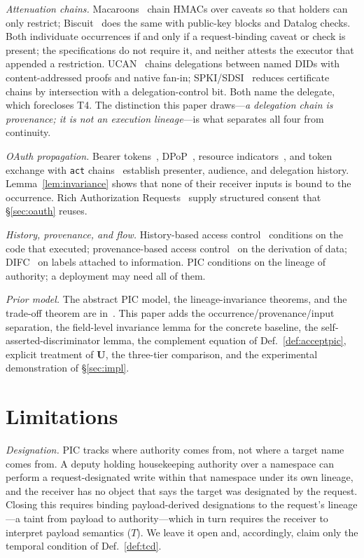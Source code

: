 \documentclass[conference]{IEEEtran}
\begin{document}
\emph{Attenuation chains.} Macaroons~\cite{macaroons} chain HMACs over caveats so that holders can only restrict; Biscuit~\cite{biscuit} does the same with public-key blocks and Datalog checks. Both individuate occurrences if and only if a request-binding caveat or check is present; the specifications do not require it, and neither attests the executor that appended a restriction. UCAN~\cite{ucan} chains delegations between named DIDs with content-addressed proofs and native fan-in; SPKI/SDSI~\cite{rfc2693} reduces certificate chains by intersection with a delegation-control bit. Both name the delegate, which forecloses T4. The distinction this paper draws---\emph{a delegation chain is provenance; it is not an execution lineage}---is what separates all four from continuity.

\emph{OAuth propagation.} Bearer tokens~\cite{rfc6749,rfc6750}, DPoP~\cite{rfc9449}, resource indicators~\cite{rfc8707}, and token exchange with \texttt{act} chains~\cite{rfc8693} establish presenter, audience, and delegation history. Lemma~\ref{lem:invariance} shows that none of their receiver inputs is bound to the occurrence. Rich Authorization Requests~\cite{rfc9396} supply structured consent that \S\ref{sec:oauth} reuses.

\emph{History, provenance, and flow.} History-based access control~\cite{abadi2003} conditions on the code that executed; provenance-based access control~\cite{park2012} on the derivation of data; DIFC~\cite{myers1997} on labels attached to information. PIC conditions on the lineage of authority; a deployment may need all of them.

\emph{Prior model.} The abstract PIC model, the lineage-invariance theorems, and the trade-off theorem are in~\cite{gallo2026poc}. This paper adds the occurrence/provenance/input separation, the field-level invariance lemma for the concrete baseline, the self-asserted-discriminator lemma, the complement equation of Def.~\ref{def:acceptpic}, explicit treatment of $\mathbf{U}$, the three-tier comparison, and the experimental demonstration of \S\ref{sec:impl}.

\section{Limitations}\label{sec:limits}

\emph{Designation.} PIC tracks where authority comes from, not where a target name comes from. A deputy holding housekeeping authority over a namespace can perform a request-designated write within that namespace under its own lineage, and the receiver has no object that says the target was designated by the request. Closing this requires binding payload-derived designations to the request's lineage---a taint from payload to authority---which in turn requires the receiver to interpret payload semantics ($T$). We leave it open and, accordingly, claim only the temporal condition of Def.~\ref{def:tcd}.
\end{document}
